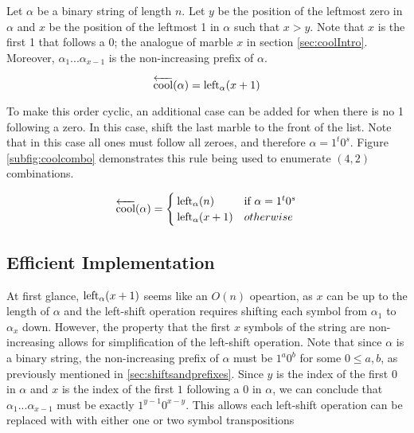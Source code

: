  Let $\alpha$ be a binary string of length $n$.
 Let $y$ be the position of the leftmost zero in $\alpha$ and $x$ be the position of the leftmost 1 in $\alpha$ such that $x > y$. Note that $x$ is the first 1 that follows a 0; the analogue of marble $x$ in section \ref{sec:coolIntro}.  Moreover, $\alpha_1...\alpha_{x-1}$ is the non-increasing prefix of $\alpha$.


 \begin{equation} \label{eq:coolCombo}
     \overleftarrow{\text{cool}}(\alpha) = \leftshift[\alpha]{x+1}
 \end{equation}

 To make this order cyclic, an additional case can be added for when there is no 1 following a zero. In this case, shift the last marble to the front of the list. Note that in this case all ones must follow all zeroes, and therefore $\alpha=1^t0^s$.  Figure \ref{subfig:coolcombo} demonstrates this rule being used to enumerate $(4,2)$ combinations.

\begin{equation}\label{eq:coolComboCyclic}
    \overleftarrow{\text{cool}}(\alpha) = \begin{cases}
	\leftshift[\alpha]{n} & \text{if } \alpha=1^t0^s \\
	\leftshift[\alpha]{x+1} & otherwise
\end{cases}
\end{equation}




\subsection{Efficient Implementation}

At first glance, $\leftshift[\alpha]{x+1}$ seems like an $O(n)$ opeartion, as $x$ can be up to the length of $\alpha$ and the left-shift operation requires shifting each symbol from $\alpha_1$ to $\alpha_{x}$ down.  However, 
the property that the first $x$ symbols of the string are non-increasing allows for simplification of the left-shift operation. Note that since $\alpha$ is a binary string, the non-increasing prefix of $\alpha$ must be $1^a0^b$ for some $0 \le a,b$, as previously mentioned in \ref{sec:shiftsandprefixes}. Since $y$ is the index of the first $0$ in $\alpha$ and $x$ is the index of the first $1$ following a $0$ in $\alpha$, we can conclude that $\alpha_1...\alpha_{x-1}$ must be exactly $1^{y-1}0^{x-y}$. This allows each left-shift operation can be replaced with with either one or two symbol transpositions 

